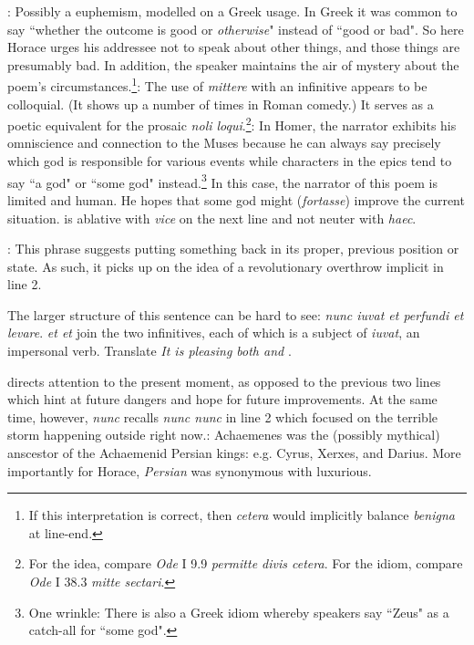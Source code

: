 
: Possibly a euphemism, modelled on a Greek usage.  In Greek it was
common to say ``whether the outcome is good or \textit{otherwise}" instead of
``good or bad".  So here Horace urges his addressee not to speak about other
things, and those things are presumably bad.  In addition, the speaker
maintains the air of mystery about the poem's circumstances.\footnote{If this
interpretation is correct, then \textit{cetera} would implicitly balance
\textit{benigna} at line-end.}\indent{}: The use of
\textit{mittere} with an infinitive appears to be colloquial.  (It shows up
a number of times in Roman comedy.)  It serves as a poetic equivalent for
the prosaic \textit{noli loqui}.\footnote{For the idea, compare \textit{Ode}
I 9.9 \textit{permitte divis cetera}. For the idiom, compare \textit{Ode} I
38.3 \textit{mitte sectari}.}\indent{}: In Homer, the narrator exhibits
his omniscience and connection to the Muses because he can always say precisely
which god is responsible for various events while characters in the epics tend
to say ``a god" or ``some god" instead.\footnote{One wrinkle: There is also a
Greek idiom whereby speakers say ``Zeus" as a catch-all for ``some god".} In
this case, the narrator of this poem is limited and human.  He hopes that some
god might (\textit{fortasse}) improve the current
situation.\indent{} is ablative with \textit{vice} on the next line
and not neuter with \textit{haec}.


: This phrase suggests putting something back in its
proper, previous position or state.  As such, it picks up on the idea of
a revolutionary overthrow implicit in line 2.


The larger structure of this sentence can be hard to see: \textit{nunc iuvat et
perfundi et levare}.  \textit{et \lips et} join the two infinitives, each of
which is a subject of \textit{iuvat}, an impersonal verb.  Translate \textit{It
is pleasing both \lips and \lips}.


 directs attention to the present moment, as opposed to the
previous two lines which hint at future dangers and hope for future
improvements.  At the same time, however, \textit{nunc} recalls \textit{nunc
\lips nunc} in line 2 which focused on the terrible storm happening outside
right now.\indent{}: Achaemenes was the (possibly mythical)
anscestor of the Achaemenid Persian kings: e.g. Cyrus, Xerxes, and Darius.
More importantly for Horace, \textit{Persian} was synonymous with luxurious.

